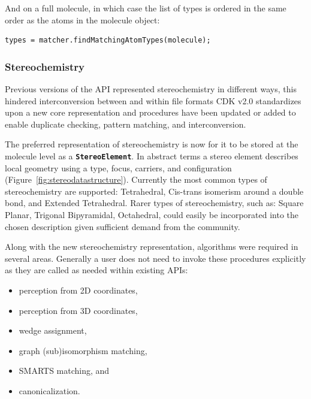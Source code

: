 \documentclass[10pt]{bmcart}
\def \cdkversion {v2.0}
\begin{document}
And on a full molecule, in which case the list of types is ordered in the same
order as the atoms in the molecule object:

\vspace{0.2cm}
\begin{verbatim}
types = matcher.findMatchingAtomTypes(molecule);
\end{verbatim}
\vspace{0.2cm}

  \subsubsection*{Stereochemistry}

  Previous versions of the API represented stereochemistry in different ways, this hindered
  interconversion between and within file formats CDK \cdkversion{} standardizes
  upon a new core representation and procedures have been updated or added to
  enable duplicate checking, pattern matching, and interconversion.

  The preferred representation of stereochemistry is now for it to be stored at the molecule
  level as a \texttt{\textbf{StereoElement}}. In abstract terms a stereo element describes local
  geometry using a type, focus, carriers, and configuration (Figure~\ref{fig:stereodatastructure}).
  Currently the most common types of stereochemistry are supported: Tetrahedral, Cis-trans isomerism 
  around a double bond, and Extended Tetrahedral. Rarer types of stereochemistry, such as: Square 
  Planar, Trigonal Bipyramidal, Octahedral, could easily be incorporated into the chosen description 
   given sufficient demand from the community.


  Along with the new stereochemistry representation, algorithms were required in several areas. Generally
  a user does not need to invoke these procedures explicitly as they are called as needed within existing
  APIs:

\vspace{0.2cm}
  \begin{itemize}
   \item perception from 2D coordinates,
   \item perception from 3D coordinates,
   \item wedge assignment,
   \item graph (sub)isomorphism matching,
   \item SMARTS matching, and
   \item canonicalization.
  \end{itemize}
\vspace{0.2cm}
\end{document}
